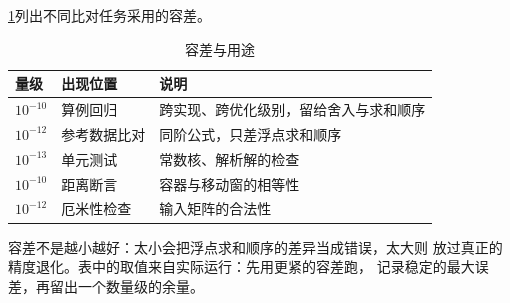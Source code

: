 \cref{tab:tolerances}列出不同比对任务采用的容差。

\begin{table}[htbp]
    \centering
    \caption[容差与用途]{容差与用途}
    \label{tab:tolerances}
    \small
    \begin{tabularx}{\textwidth}{@{}llX@{}}
        \toprule
        量级 & 出现位置 & 说明 \\
        \midrule
        $10^{-10}$ & 算例回归 & 跨实现、跨优化级别，留给舍入与求和顺序 \\
        $10^{-12}$ & 参考数据比对 & 同阶公式，只差浮点求和顺序 \\
        $10^{-13}$ & 单元测试 & 常数核、解析解的检查 \\
        $10^{-10}$ & 距离断言 & 容器与移动窗的相等性 \\
        $10^{-12}$ & 厄米性检查 & 输入矩阵的合法性 \\
        \bottomrule
    \end{tabularx}
\end{table}

容差不是越小越好：太小会把浮点求和顺序的差异当成错误，太大则
放过真正的精度退化。表中的取值来自实际运行：先用更紧的容差跑，
记录稳定的最大误差，再留出一个数量级的余量。

